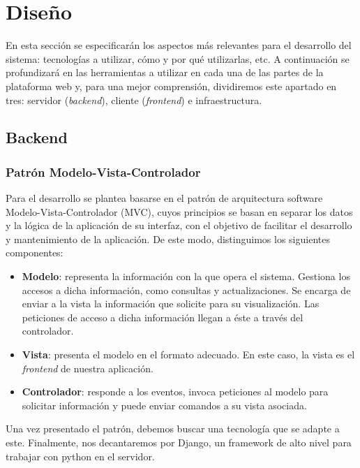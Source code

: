 \chapter{Diseño}
\label{cap:disenio}

En esta sección se especificarán los aspectos más relevantes para el desarrollo del sistema: tecnologías a utilizar, cómo y por qué utilizarlas, etc. A continuación se profundizará en las herramientas a utilizar en cada una de las partes de la plataforma web y, para una mejor comprensión, dividiremos este apartado en tres: servidor (\textit{backend}), cliente (\textit{frontend}) e infraestructura.

\section{Backend}

\subsection{Patrón Modelo-Vista-Controlador}

Para el desarrollo se plantea basarse en el patrón de arquitectura software Modelo-Vista-Controlador (MVC), cuyos principios se basan en separar los datos y la lógica de la aplicación de su interfaz, con el objetivo de facilitar el desarrollo y mantenimiento de la aplicación. De este modo, distinguimos los siguientes componentes:

\begin{itemize}
    \item \textbf{Modelo}: representa la información con la que opera el sistema. Gestiona los accesos a dicha información, como consultas y actualizaciones. Se encarga de enviar a la vista la información que solicite para su visualización. Las peticiones de acceso a dicha información llegan a éste a través del controlador.
    \item \textbf{Vista}: presenta el modelo en el formato adecuado. En este caso, la vista es el \textit{frontend} de nuestra aplicación.
    \item \textbf{Controlador}: responde a los eventos, invoca peticiones al modelo para solicitar información y puede enviar comandos a su vista asociada.
\end{itemize}

Una vez presentado el patrón, debemos buscar una tecnología que se adapte a este. Finalmente, nos decantaremos por Django, un framework de alto nivel para trabajar con python en el servidor.

